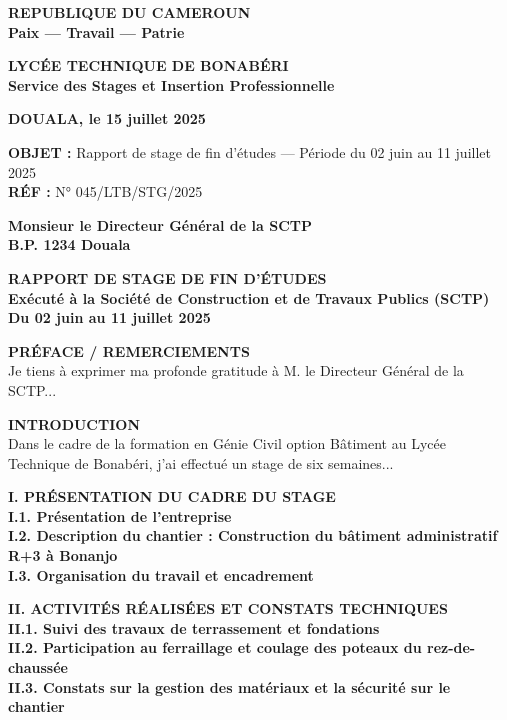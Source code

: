 \documentclass[11pt]{article}
\begin{document}
\begin{exemplebox}
\textbf{REPUBLIQUE DU CAMEROUN}\\
\textbf{Paix — Travail — Patrie}\\
\medskip
\begin{minipage}{\linewidth}
\textbf{LYCÉE TECHNIQUE DE BONABÉRI}\\
\textbf{Service des Stages et Insertion Professionnelle}
\end{minipage}
\medskip

\noindent\textbf{DOUALA, le 15 juillet 2025}\\
\medskip

\noindent\textbf{OBJET :} Rapport de stage de fin d'études — Période du 02 juin au 11 juillet 2025\\
\textbf{RÉF :} N° 045/LTB/STG/2025
\medskip

\noindent\textbf{Monsieur le Directeur Général de la SCTP}\\
\textbf{B.P. 1234 Douala}
\medskip

\begin{center}
\textbf{\Large RAPPORT DE STAGE DE FIN D'ÉTUDES}\\
\textbf{\large Exécuté à la Société de Construction et de Travaux Publics (SCTP)}\\
\textbf{\large Du 02 juin au 11 juillet 2025}
\end{center}
\medskip

\noindent\textbf{PRÉFACE / REMERCIEMENTS}\\
Je tiens à exprimer ma profonde gratitude à M. le Directeur Général de la SCTP...
\medskip

\noindent\textbf{INTRODUCTION}\\
Dans le cadre de la formation en Génie Civil option Bâtiment au Lycée Technique de Bonabéri, j'ai effectué un stage de six semaines...
\medskip

\noindent\textbf{I. PRÉSENTATION DU CADRE DU STAGE}\\
\textbf{I.1. Présentation de l'entreprise}\\
\textbf{I.2. Description du chantier : Construction du bâtiment administratif R+3 à Bonanjo}\\
\textbf{I.3. Organisation du travail et encadrement}
\medskip

\noindent\textbf{II. ACTIVITÉS RÉALISÉES ET CONSTATS TECHNIQUES}\\
\textbf{II.1. Suivi des travaux de terrassement et fondations}\\
\textbf{II.2. Participation au ferraillage et coulage des poteaux du rez-de-chaussée}\\
\textbf{II.3. Constats sur la gestion des matériaux et la sécurité sur le chantier}
\medskip


\end{exemplebox}
\end{document}
